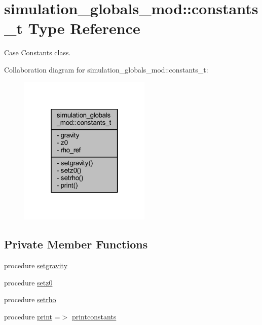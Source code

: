 \hypertarget{structsimulation__globals__mod_1_1constants__t}{}\section{simulation\+\_\+globals\+\_\+mod\+:\+:constants\+\_\+t Type Reference}
\label{structsimulation__globals__mod_1_1constants__t}


Case Constants class.  




Collaboration diagram for simulation\+\_\+globals\+\_\+mod\+:\+:constants\+\_\+t\+:\nopagebreak
\begin{figure}[H]
\begin{center}
\leavevmode
\includegraphics[width=178pt]{structsimulation__globals__mod_1_1constants__t__coll__graph}
\end{center}
\end{figure}
\subsection*{Private Member Functions}
\begin{DoxyCompactItemize}
\item 
procedure \mbox{\hyperlink{structsimulation__globals__mod_1_1constants__t_af7a73fd39f95eb68c5d070c08d14bb4d}{setgravity}}
\item 
procedure \mbox{\hyperlink{structsimulation__globals__mod_1_1constants__t_a0ad20f9a9b8c4fd0a6813415e690353a}{setz0}}
\item 
procedure \mbox{\hyperlink{structsimulation__globals__mod_1_1constants__t_a184df716402820585a1edbf2933215ec}{setrho}}
\item 
procedure \mbox{\hyperlink{structsimulation__globals__mod_1_1constants__t_a920570af3904fb782a96d3765e314468}{print}} =$>$ \mbox{\hyperlink{namespacesimulation__globals__mod_a20ba28d72a9bea823d9373a94f97026e}{printconstants}}
\end{DoxyCompactItemize}
